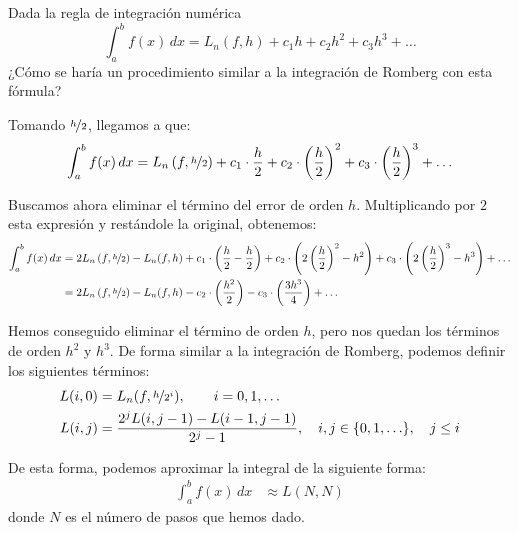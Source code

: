 \documentclass[12pt]{article}
\begin{document}
{    \begin{ejercicio}
        Dada la regla de integración numérica
        \begin{equation*}
            \int_a^b f(x) \, dx = L_n(f, h) + c_1 h + c_2 h^2 + c_3 h^3 + \ldots
        \end{equation*}
        ¿Cómo se haría un procedimiento similar a la integración de Romberg con esta fórmula?


        Tomando $\nicefrac{h}{2}$, llegamos a que:
        \begin{align*}
            \int_a^b f(x) \, dx &= L_n\left(f,\nicefrac{h}{2}\right) + c_1 \cdot \frac{h}{2} + c_2 \cdot \left(\frac{h}{2}\right)^2 + c_3 \cdot \left(\frac{h}{2}\right)^3 + \ldots\\
        \end{align*}

        Buscamos ahora eliminar el término del error de orden $h$. Multiplicando por $2$ esta expresión y restándole la original, obtenemos:
        \begin{align*}
            \int_a^b f(x) \, dx &= 2L_n\left(f,\nicefrac{h}{2}\right) - L_n(f, h) + c_1 \cdot \left(\frac{h}{2}-\frac{h}{2}\right) + c_2 \cdot \left(2\left(\frac{h}{2}\right)^2 - h^2\right) + c_3 \cdot \left(2\left(\frac{h}{2}\right)^3 - h^3\right) + \ldots\\
            &= 2L_n\left(f,\nicefrac{h}{2}\right) - L_n(f, h) - c_2 \cdot \left(\frac{h^2}{2}\right) - c_3 \cdot \left(\frac{3h^3}{4}\right) + \ldots\\
        \end{align*}

        Hemos conseguido eliminar el término de orden $h$, pero nos quedan los términos de orden $h^2$ y $h^3$. De forma similar a la integración de Romberg, podemos definir los siguientes términos:
        \begin{align*}
            L(i,0) &= L_n(f, \nicefrac{h}{2^i}),\qquad i=0,1,\ldots\\
            L(i,j) &= \dfrac{2^jL(i,j-1)-L(i-1,j-1)}{2^j-1}, \quad i,j\in \{0,1,\ldots\}, \quad j\leq i\\
        \end{align*}

        De esta forma, podemos aproximar la integral de la siguiente forma:
        \begin{align*}
            \int_a^b f(x) \, dx &\approx L(N,N)
        \end{align*}
        donde $N$ es el número de pasos que hemos dado.
    \end{ejercicio}
    }
\end{document}
